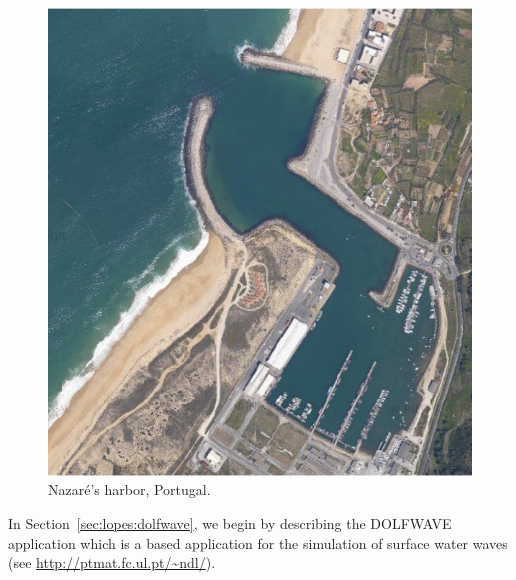 \begin{figure}
  \begin{center}
    \includegraphics[width=\smallfig]{chapters/lopes/pdf/nazare1.pdf}
  \end{center}
  \caption{Nazar\'{e}'s harbor, Portugal.}
  \label{fig:lopes:harbor}
\end{figure}

In Section~\ref{sec:lopes:dolfwave}, we begin by describing the DOLFWAVE
application which is a \fenics based application for the simulation of
surface water waves (see \url{http://ptmat.fc.ul.pt/~ndl/}).


